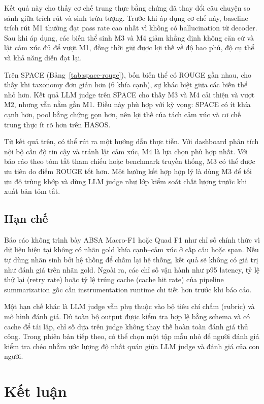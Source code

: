 \documentclass[12pt,a4paper]{report}
\begin{document}
Kết quả này cho thấy cơ chế trung thực bằng chứng đã thay đổi câu chuyện so sánh giữa trích rút và sinh trừu tượng. Trước khi áp dụng cơ chế này, baseline trích rút M1 thường đạt pass rate cao nhất vì không có hallucination từ decoder. Sau khi áp dụng, các biến thể sinh M3 và M4 giảm khẳng định không căn cứ và lật cảm xúc đủ để vượt M1, đồng thời giữ được lợi thế về độ bao phủ, độ cụ thể và khả năng diễn đạt lại.

Trên SPACE (Bảng~\ref{tab:space-rouge}), bốn biến thể có ROUGE gần nhau, cho thấy khi taxonomy đơn giản hơn (6 khía cạnh), sự khác biệt giữa các biến thể nhỏ hơn. Kết quả LLM judge trên SPACE cho thấy M3 và M4 cải thiện và vượt M2, nhưng vẫn nằm gần M1. Điều này phù hợp với kỳ vọng: SPACE có ít khía cạnh hơn, pool bằng chứng gọn hơn, nên lợi thế của tách cảm xúc và cơ chế trung thực ít rõ hơn trên HASOS.

Từ kết quả trên, có thể rút ra một hướng dẫn thực tiễn. Với dashboard phân tích nội bộ cần độ tin cậy và tránh lật cảm xúc, M4 là lựa chọn phù hợp nhất. Với báo cáo theo tóm tắt tham chiếu hoặc benchmark truyền thống, M3 có thể được ưu tiên do điểm ROUGE tốt hơn. Một hướng kết hợp hợp lý là dùng M3 để tối ưu độ trùng khớp và dùng LLM judge như lớp kiểm soát chất lượng trước khi xuất bản tóm tắt.

\section{Hạn chế}

Báo cáo không trình bày ABSA Macro-F1 hoặc Quad F1 như chỉ số chính thức vì dữ liệu hiện tại không có nhãn gold khía cạnh--cảm xúc ở cấp câu hoặc span. Nếu tự dùng nhãn sinh bởi hệ thống để chấm lại hệ thống, kết quả sẽ không có giá trị như đánh giá trên nhãn gold. Ngoài ra, các chỉ số vận hành như p95 latency, tỷ lệ thử lại (retry rate) hoặc tỷ lệ trúng cache (cache hit rate) của pipeline summarization gốc cần instrumentation runtime chi tiết hơn trước khi báo cáo.

Một hạn chế khác là LLM judge vẫn phụ thuộc vào bộ tiêu chí chấm (rubric) và mô hình đánh giá. Dù toàn bộ output được kiểm tra hợp lệ bằng schema và có cache để tái lập, chỉ số dựa trên judge không thay thế hoàn toàn đánh giá thủ công. Trong phiên bản tiếp theo, có thể chọn một tập mẫu nhỏ để người đánh giá kiểm tra chéo nhằm ước lượng độ nhất quán giữa LLM judge và đánh giá của con người.

\chapter{Kết luận}
\end{document}
